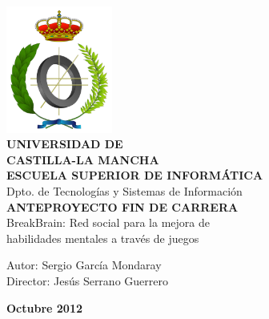 \documentclass[12pt,a4paper]{article}
\begin{document}
\newcommand{\titulo}{BreakBrain: Red social para la mejora de\\[0.2cm]habilidades mentales a través de juegos}
\newcommand{\autor}{Sergio García Mondaray}
\newcommand{\fecha}{Octubre 2012}
\newcommand{\director}{Jesús Serrano Guerrero}


\thispagestyle{empty}
\begin{center}
  \includegraphics[width=35mm]{img/logo.png}\\[10mm]
  {\Large \textbf{UNIVERSIDAD DE\\[0.2cm]CASTILLA-LA MANCHA}} \\[0.9cm]    
  {\Large \textbf{ESCUELA SUPERIOR DE INFORMÁTICA}}\\[1cm]
  {\Large Dpto. de Tecnologías y Sistemas de Información}\\[35mm]
  {\Large \textbf{ANTEPROYECTO FIN DE CARRERA}} \\[1cm]
  {\Large \titulo}\\
\end{center}

\vspace{20mm}

\begin{flushleft}
  {\large Autor:\hspace{5mm} \autor}\\[0.2cm]
  {\large Director:\hspace{5mm} \director}\\[0.2cm]
\end{flushleft}

\vfill
\hfill
{\large \textbf{\fecha}}

\newpage

\tableofcontents

\newpage

\end{document}
